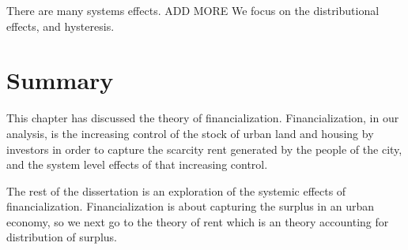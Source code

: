There are many systems effects. ADD MORE %
We focus on the distributional effects, and hysteresis.

\section{Summary} %

This chapter has discussed the theory of financialization.
Financialization, in our analysis, is the increasing control of the stock of urban land and housing by investors in order to capture the scarcity rent generated by the people of the city, and the system level effects of that increasing control.  

The rest of the dissertation is an exploration of the systemic effects of financialization. 
Financialization is about capturing the surplus in an urban economy, so we next go to the theory of rent which is an theory accounting for distribution of surplus. 